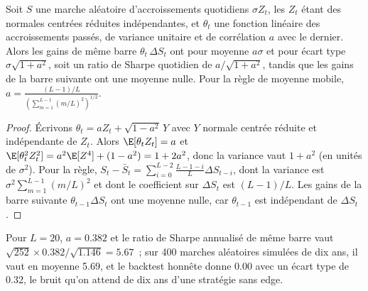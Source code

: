 \begin{proposition}\label{prop:qm:ito-calculus:lookahead}
Soit $S$ une marche aléatoire d'accroissements quotidiens $\sigma Z_t$, les $Z_t$ étant des normales centrées réduites indépendantes,
et $\theta_t$ une fonction linéaire des accroissements passés, de variance unitaire et de corrélation $a$ avec le
dernier. Alors les gains de même barre $\theta_t\,\Delta S_t$ ont pour moyenne $a\sigma$ et pour
écart type $\sigma\sqrt{1 + a^2}$, soit un ratio de Sharpe quotidien de $a/\sqrt{1 + a^2}$, tandis que les gains de la barre suivante
ont une moyenne nulle. Pour la règle de moyenne mobile, $a = \frac{(L-1)/L}{(\sum_{m=1}^{L-1}(m/L)^2)^{1/2}}$.
\end{proposition}

\begin{proof}
Écrivons $\theta_t = aZ_t + \sqrt{1 - a^2}\,Y$ avec $Y$ normale centrée réduite et indépendante de $Z_t$. Alors
$\E[\theta_tZ_t] = a$ et $\E[\theta_t^2Z_t^2] = a^2\E[Z^4] + (1 - a^2) = 1 + 2a^2$, donc la variance vaut
$1 + a^2$ (en unités de $\sigma^2$). Pour la règle, $S_t - \bar S_t = \sum_{i=0}^{L-2}\frac{L-1-i}{L}\Delta
S_{t-i}$, dont la variance est $\sigma^2\sum_{m=1}^{L-1}(m/L)^2$ et dont le coefficient sur $\Delta S_t$ est
$(L-1)/L$. Les gains de la barre suivante $\theta_{t-1}\Delta S_t$ ont une moyenne nulle, car $\theta_{t-1}$ est indépendant
de $\Delta S_t$.
\end{proof}

Pour $L = 20$, $a = 0.382$ et le ratio de Sharpe annualisé de même barre vaut $\sqrt{252}\times 0.382/
\sqrt{1.146} = 5.67$~; sur 400 marches aléatoires simulées de dix ans, il vaut en moyenne 5.69, et le backtest honnête
donne 0.00 avec un écart type de 0.32, le bruit qu'on attend de dix ans d'une
stratégie sans edge.

